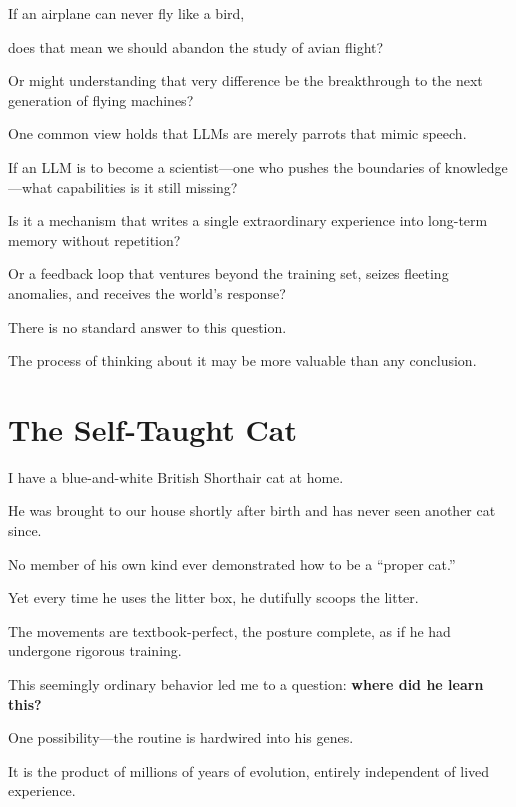 If an airplane can never fly like a bird,

does that mean we should abandon the study of avian flight?

Or might understanding that very difference be the breakthrough to the next generation of flying machines?

\vspace{1em}

One common view holds that LLMs are merely parrots that mimic speech.

If an LLM is to become a scientist---one who pushes the boundaries of knowledge---what capabilities is it still missing?

Is it a mechanism that writes a single extraordinary experience into long-term memory without repetition?

Or a feedback loop that ventures beyond the training set, seizes fleeting anomalies, and receives the world's response?

\vspace{1em}

There is no standard answer to this question.

The process of thinking about it may be more valuable than any conclusion.

\vspace{1em}

\newpage
\section{The Self-Taught Cat}

I have a blue-and-white British Shorthair cat at home.

He was brought to our house shortly after birth and has never seen another cat since.

No member of his own kind ever demonstrated how to be a ``proper cat.''

Yet every time he uses the litter box, he dutifully scoops the litter.

The movements are textbook-perfect, the posture complete, as if he had undergone rigorous training.

This seemingly ordinary behavior led me to a question: \textbf{where did he learn this?}

\vspace{1em}

One possibility---the routine is hardwired into his genes.

It is the product of millions of years of evolution, entirely independent of lived experience.

